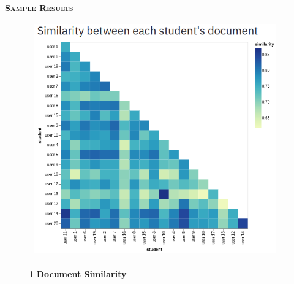 \documentclass[final,t]{beamer}
\begin{document}
\begin{frame}{}
\begin{columns}
\begin{column}{.5\linewidth}
\begin{block}{\textsc{\textbf{Sample Results}}}
\begin{figure}
\begin{tabular}{cc}
					\includegraphics[scale = 1.2]{graphics/docSim.png}
				\end{tabular}				
				\caption{\ref{fig:docSim} \textbf{Document Similarity}}
				\label{fig:docSim}
			\end{figure}
			\vspace*{3mm}
	
	\end{block}

	\end{column}


	\end{columns}
	\end{frame}
\end{document}
